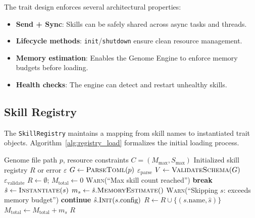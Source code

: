 \documentclass{article}
\newcommand{\REQUIRE}{\Require}
\newcommand{\ENSURE}{\Ensure}
\begin{document}
The trait design enforces several architectural properties:
\begin{itemize}[leftmargin=*]
    \item \textbf{Send + Sync}: Skills can be safely shared across async tasks and threads.
    \item \textbf{Lifecycle methods}: \texttt{init}/\texttt{shutdown} ensure clean resource management.
    \item \textbf{Memory estimation}: Enables the Genome Engine to enforce memory budgets before loading.
    \item \textbf{Health checks}: The engine can detect and restart unhealthy skills.
\end{itemize}


\subsection{Skill Registry}

The \texttt{SkillRegistry} maintains a mapping from skill names to instantiated trait objects. Algorithm~\ref{alg:registry_load} formalizes the initial loading process.

\begin{algorithm}[t]
\caption{Genome Loading and Skill Registry Initialization}
\label{alg:registry_load}
\begin{algorithmic}[1]
\REQUIRE Genome file path $p$, resource constraints $C = (M_{\max}, S_{\max})$
\ENSURE Initialized skill registry $R$ or error $\varepsilon$
\State $G \leftarrow \textsc{ParseToml}(p)$ 
    \State \Return $\varepsilon_{\text{parse}}$
\EndIf
\State $V \leftarrow \textsc{ValidateSchema}(G)$ 
    \State \Return $\varepsilon_{\text{validate}}$
\EndIf
\State $R \leftarrow \emptyset$; $M_{\text{total}} \leftarrow 0$
        \State \textsc{Warn}(``Max skill count reached'')
        \State \textbf{break}
    \EndIf
    \State $\hat{s} \leftarrow \textsc{Instantiate}(s)$ 
    \State $m_s \leftarrow \hat{s}.\textsc{MemoryEstimate}()$
        \State \textsc{Warn}(``Skipping $s$: exceeds memory budget'')
        \State \textbf{continue}
    \EndIf
    \State $\hat{s}.\textsc{Init}(s.\text{config})$ 
    \State $R \leftarrow R \cup \{(s.\text{name}, \hat{s})\}$
    \State $M_{\text{total}} \leftarrow M_{\text{total}} + m_s$
\EndFor
\State \Return $R$
\end{algorithmic}
\end{algorithm}
\end{document}

